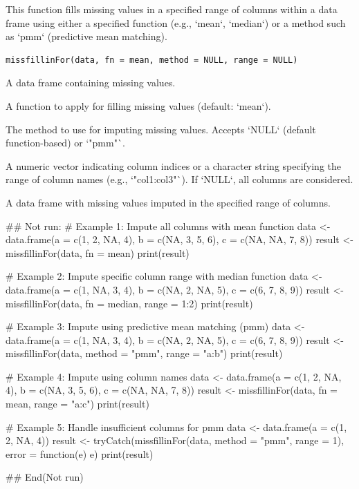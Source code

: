 \documentclass[a4paper]{book}
\begin{document}
%
\begin{Description}
This function fills missing values in a specified range of columns within a data frame using either
a specified function (e.g., `mean`, `median`) or a method such as `pmm` (predictive mean matching).
\end{Description}
%
\begin{Usage}
\begin{verbatim}
missfillinFor(data, fn = mean, method = NULL, range = NULL)
\end{verbatim}
\end{Usage}
%
\begin{Arguments}
\begin{ldescription}
\item[\code{data}] A data frame containing missing values.

\item[\code{fn}] A function to apply for filling missing values (default: `mean`).

\item[\code{method}] The method to use for imputing missing values. Accepts `NULL` (default function-based) or `"pmm"`.

\item[\code{range}] A numeric vector indicating column indices or a character string specifying the range of column names (e.g., `"col1:col3"`).
If `NULL`, all columns are considered.
\end{ldescription}
\end{Arguments}
%
\begin{Value}
A data frame with missing values imputed in the specified range of columns.
\end{Value}
%
\begin{Examples}
\begin{ExampleCode}
\#\# Not run: 
# Example 1: Impute all columns with mean function
data <- data.frame(a = c(1, 2, NA, 4), b = c(NA, 3, 5, 6), c = c(NA, NA, 7, 8))
result <- missfillinFor(data, fn = mean)
print(result)

# Example 2: Impute specific column range with median function
data <- data.frame(a = c(1, NA, 3, 4), b = c(NA, 2, NA, 5), c = c(6, 7, 8, 9))
result <- missfillinFor(data, fn = median, range = 1:2)
print(result)

# Example 3: Impute using predictive mean matching (pmm)
data <- data.frame(a = c(1, NA, 3, 4), b = c(NA, 2, NA, 5), c = c(6, 7, 8, 9))
result <- missfillinFor(data, method = "pmm", range = "a:b")
print(result)

# Example 4: Impute using column names
data <- data.frame(a = c(1, 2, NA, 4), b = c(NA, 3, 5, 6), c = c(NA, NA, 7, 8))
result <- missfillinFor(data, fn = mean, range = "a:c")
print(result)

# Example 5: Handle insufficient columns for pmm
data <- data.frame(a = c(1, 2, NA, 4))
result <- tryCatch(missfillinFor(data, method = "pmm", range = 1), error = function(e) e)
print(result)

## End(Not run)
\end{ExampleCode}
\end{Examples}
\end{document}
